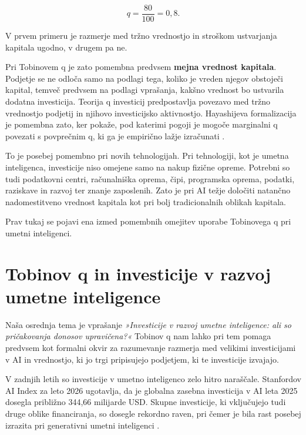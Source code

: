 \documentclass[12pt,a4paper]{article}
\begin{document}
\begin{equation}
q=\frac{80}{100}=0,8.
\end{equation}

V prvem primeru je razmerje med tržno vrednostjo in stroškom ustvarjanja kapitala ugodno, v drugem pa ne.

Pri Tobinovem q je zato pomembna predvsem \textbf{mejna vrednost kapitala}. Podjetje se ne odloča samo na podlagi tega, koliko je vreden njegov obstoječi kapital, temveč predvsem na podlagi vprašanja, kakšno vrednost bo ustvarila dodatna investicija. Teorija q investicij predpostavlja povezavo med tržno vrednostjo podjetij in njihovo investicijsko aktivnostjo. Hayashijeva formalizacija je pomembna zato, ker pokaže, pod katerimi pogoji je mogoče marginalni q povezati s povprečnim q, ki ga je  empirično lažje izračunati \citep{AndreiMannMoyen2017}.

To je posebej pomembno pri novih tehnologijah. Pri tehnologiji, kot je umetna inteligenca, investicije niso omejene samo na nakup fizične opreme. Potrebni so tudi podatkovni centri, računalniška oprema, čipi, programska oprema, podatki, raziskave in razvoj ter znanje zaposlenih. Zato je pri AI težje določiti natančno nadomestitveno vrednost kapitala kot pri bolj tradicionalnih oblikah kapitala.

Prav tukaj se pojavi ena izmed pomembnih omejitev uporabe Tobinovega q pri umetni inteligenci.


\section{Tobinov q in investicije v razvoj umetne inteligence}

Naša osrednja tema je vprašanje \textit{»Investicije v razvoj umetne inteligence: ali so pričakovanja donosov upravičena?«} Tobinov q nam lahko pri tem pomaga predvsem kot formalni okvir za razumevanje razmerja med velikimi investicijami v AI in vrednostjo, ki jo trgi pripisujejo podjetjem, ki te investicije izvajajo.

V zadnjih letih so investicije v umetno inteligenco zelo hitro naraščale. Stanfordov AI Index za leto 2026 ugotavlja, da je globalna zasebna investicija v AI leta 2025 dosegla približno 344,66 milijarde USD. Skupne investicije, ki vključujejo tudi druge oblike financiranja, so dosegle rekordno raven, pri čemer je bila rast posebej izrazita pri generativni umetni inteligenci \citep{StanfordAIIndex2026}.
\end{document}
